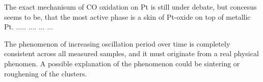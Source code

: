 \documentclass[8.5pt,twoside,twocolumn]{article}
\begin{document}
The exact mechanisum of CO oxidation on Pt is still under debate, but concesus seems to be, that the most active phase is a skin of Pt-oxide on top of metallic Pt. ..... .... ... ...

The phenomenon of increasing oscillation period over time is completely consistent across all measured samples, and it must originate from a real physical phenomen. A possible explanation of the phenomenon could be sintering or roughening of the clusters.










\end{document}
